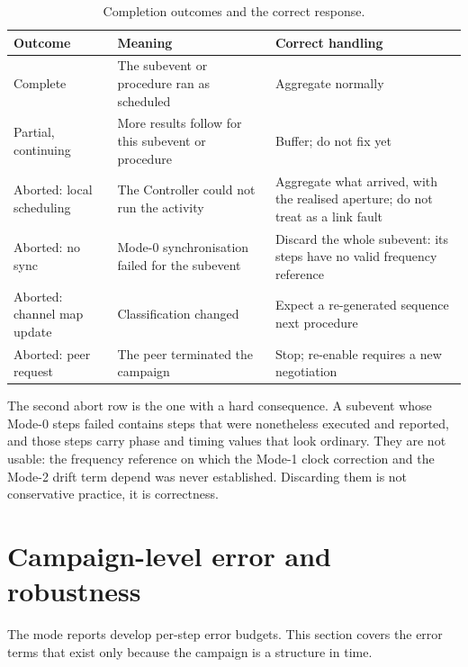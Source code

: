 \documentclass[11pt,a4paper]{article}
\begin{document}
\begin{table}[h]
\caption{Completion outcomes and the correct response.}
\label{tab:abort}
\centering\small
\begin{tabular}{@{}L{34mm}L{46mm}L{50mm}@{}}
\toprule
Outcome & Meaning & Correct handling \\
\midrule
Complete & The subevent or procedure ran as scheduled & Aggregate normally \\
Partial, continuing & More results follow for this subevent or procedure & Buffer; do not fix yet \\
Aborted: local scheduling & The Controller could not run the activity & Aggregate what arrived, with
   the realised aperture; do not treat as a link fault \\
Aborted: no sync & Mode-0 synchronisation failed for the subevent & Discard the whole subevent: its
   steps have no valid frequency reference \\
Aborted: channel map update & Classification changed & Expect a re-generated sequence next procedure \\
Aborted: peer request & The peer terminated the campaign & Stop; re-enable requires a new negotiation \\
\bottomrule
\end{tabular}
\end{table}

The second abort row is the one with a hard consequence. A subevent whose Mode-0 steps failed
contains steps that were nonetheless executed and reported, and those steps carry phase and timing
values that look ordinary. They are not usable: the frequency reference on which the Mode-1 clock
correction and the Mode-2 drift term depend was never established. Discarding them is not
conservative practice, it is correctness.

\section{Campaign-level error and robustness}
\label{sec:robust}

The mode reports develop per-step error budgets. This section covers the error terms that exist only
because the campaign is a structure in time.
\end{document}
